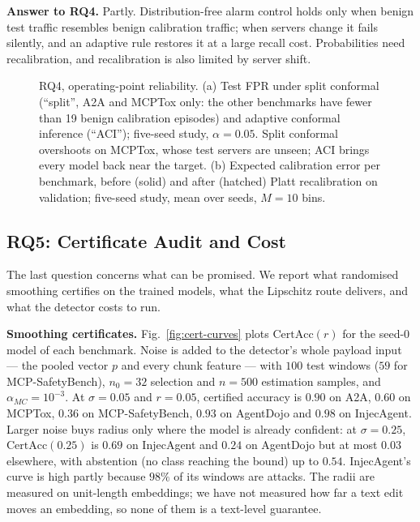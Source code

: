 \documentclass[conference,compsoc]{IEEEtran}
\begin{document}
\textbf{Answer to RQ4.} Partly. Distribution-free alarm control holds only when benign test traffic resembles benign calibration traffic; when servers change it fails silently, and an adaptive rule restores it at a large recall cost. Probabilities need recalibration, and recalibration is also limited by server shift.

\begin{figure}[!t]
\centering

\caption{RQ4, operating-point reliability. (a) Test FPR under split conformal (``split'', A2A and MCPTox only: the other benchmarks have fewer than 19 benign calibration episodes) and adaptive conformal inference (``ACI''); five-seed study, $\alpha=0.05$. Split conformal overshoots on MCPTox, whose test servers are unseen; ACI brings every model back near the target. (b) Expected calibration error per benchmark, before (solid) and after (hatched) Platt recalibration on validation; five-seed study, mean over seeds, $M=10$ bins.}
\label{fig:ops}
\end{figure}

\subsection{RQ5: Certificate Audit and Cost}
\label{sec:res-cert}
The last question concerns what can be promised. We report what randomised smoothing certifies on the trained models, what the Lipschitz route delivers, and what the detector costs to run.

\textbf{Smoothing certificates.} Fig.~\ref{fig:cert-curves} plots $\mathrm{CertAcc}(r)$ for the seed-0 model of each benchmark. Noise is added to the detector's whole payload input --- the pooled vector $p$ and every chunk feature --- with $100$ test windows ($59$ for MCP-SafetyBench), $n_{0}=32$ selection and $n=500$ estimation samples, and $\alpha_{MC}=10^{-3}$. At $\sigma=0.05$ and $r=0.05$, certified accuracy is $0.90$ on A2A, $0.60$ on MCPTox, $0.36$ on MCP-SafetyBench, $0.93$ on AgentDojo and $0.98$ on InjecAgent. Larger noise buys radius only where the model is already confident: at $\sigma=0.25$, $\mathrm{CertAcc}(0.25)$ is $0.69$ on InjecAgent and $0.24$ on AgentDojo but at most $0.03$ elsewhere, with abstention (no class reaching the bound) up to $0.54$. InjecAgent's curve is high partly because $98\%$ of its windows are attacks. The radii are measured on unit-length embeddings; we have not measured how far a text edit moves an embedding, so none of them is a text-level guarantee.
\end{document}

